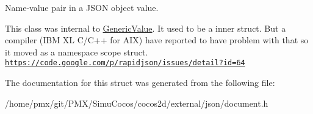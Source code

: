 Name-\/value pair in a J\+S\+ON object value. 

This class was internal to \hyperlink{classGenericValue}{Generic\+Value}. It used to be a inner struct. But a compiler (I\+BM XL C/\+C++ for A\+IX) have reported to have problem with that so it moved as a namespace scope struct. \href{https://code.google.com/p/rapidjson/issues/detail?id=64}{\tt https\+://code.\+google.\+com/p/rapidjson/issues/detail?id=64} 

The documentation for this struct was generated from the following file\+:\begin{DoxyCompactItemize}
\item 
/home/pmx/git/\+P\+M\+X/\+Simu\+Cocos/cocos2d/external/json/document.\+h\end{DoxyCompactItemize}
